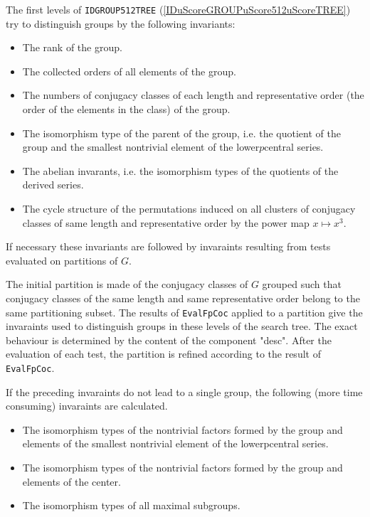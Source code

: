 \documentclass[a4paper,11pt]{report}
\begin{document}
{{ The first levels of \texttt{ID{\textunderscore}GROUP{\textunderscore}512{\textunderscore}TREE} (\ref{IDuScoreGROUPuScore512uScoreTREE}) try to distinguish groups by the following invariants: 
\begin{itemize}
\item  The rank of the group. 
\item  The collected orders of all elements of the group. 
\item  The numbers of conjugacy classes of each length and representative order (the
order of the elements in the class) of the group. 
\item  The isomorphism type of the parent of the group, i.e. the quotient of the
group and the smallest non\texttt{}trivial element of the
lower\texttt{}$p$\texttt{}central series. 
\item  The abelian invarants, i.e. the isomorphism types of the quotients of the
derived series. 
\item  The cycle structure of the permutations induced on all clusters of conjugacy
classes of same length and representative order by the power map $x\mapsto x^3$. 
\end{itemize}
 

 If necessary these invariants are followed by invaraints resulting from tests
evaluated on partitions of $G$. 

 The initial partition is made of the conjugacy classes of $G$ grouped such that conjugacy classes of the same length and same representative
order belong to the same partitioning subset. The results of \texttt{EvalFpCoc} applied to a partition give the invaraints used to distinguish groups in these
levels of the search tree. The exact behaviour is determined by the content of
the component "desc". After the evaluation of each test, the partition is
refined according to the result of \texttt{EvalFpCoc}. 

 If the preceding invaraints do not lead to a single group, the following (more
time consuming) invaraints are calculated. 
\begin{itemize}
\item  The isomorphism types of the non\texttt{}trivial factors formed by
the group and elements of the smallest non\texttt{}trivial element
of the lower\texttt{}p\texttt{}central series. 
\item  The isomorphism types of the non\texttt{}trivial factors formed by
the group and elements of the center. 
\item  The isomorphism types of all maximal subgroups. 
\end{itemize}
 

}}
\end{document}
